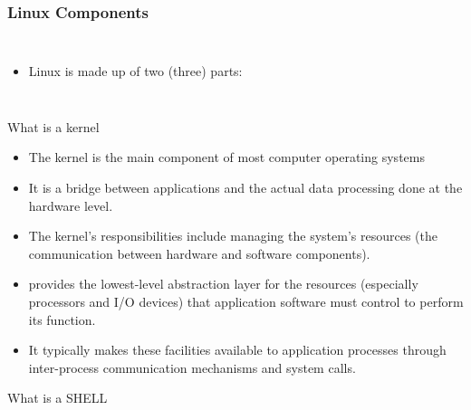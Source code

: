 \documentclass[10pt,t]{beamer}
\begin{document}
\begin{frame}[allowframebreaks]
  \frametitle{Linux Components}
  \begin{columns}[T]
  \begin{itemize}
    \item Linux is made up of two (three) parts:
  \end{itemize}
  \end{columns}
  \begin{block}{What is a kernel}
    \begin{itemize}
      \item The kernel is the main component of most computer operating systems
      \item It is a bridge between applications and the actual data processing done at the hardware level.
      \item The kernel's responsibilities include managing the system's resources (the communication between hardware and software components).
      \item provides the lowest-level abstraction layer for the resources (especially processors and I/O devices) that application software must control to perform its function.
      \item It typically makes these facilities available to application processes through inter-process communication mechanisms and system calls.
    \end{itemize}
  \end{block}
  \begin{exampleblock}{What is a SHELL}

\end{exampleblock}
\end{frame}
\end{document}
